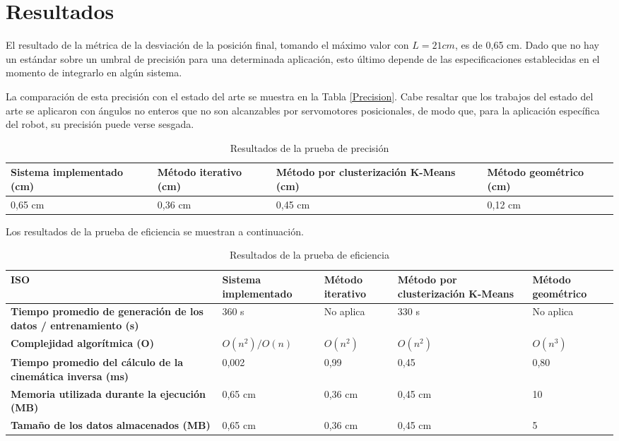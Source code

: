 \section{Resultados}

El resultado de la métrica de la desviación de la posición final, tomando el máximo valor con $L = 21 cm$, es de 0,65 cm. Dado que no hay un estándar sobre un umbral de precisión para una determinada aplicación, esto último depende de las especificaciones establecidas en el momento de integrarlo en algún sistema.

La comparación de esta precisión con el estado del arte se muestra en la Tabla \ref{Precision}. Cabe resaltar que los trabajos del estado del arte se aplicaron con ángulos no enteros que no son alcanzables por servomotores posicionales, de modo que, para la aplicación específica del robot, su precisión puede verse sesgada.

\begin{table}[ht]
	\centering
	\begin{tabular}{p{5cm}p{4cm}p{3.6cm}p{4cm}}
		\hline
		\textbf{Sistema implementado (cm)} & \textbf{Método iterativo (cm)} & \textbf{Método por clusterización K-Means (cm)} & \textbf{Método geométrico (cm)} \\
		\hline
		0,65 cm & 0,36 cm & 0,45 cm & 0,12 cm \\
		\hline
	\end{tabular}
	\caption{Resultados de la prueba de precisión}
	\label{tab:Precision}
\end{table}

Los resultados de la prueba de eficiencia se muestran a continuación.

\begin{table}[ht]
	\centering
	\begin{tabular}{p{3.2cm}p{3.2cm}p{3.2cm}p{3.2cm}p{3.2cm}}
		\hline
	    \textbf{ISO} & \textbf{Sistema implementado} & \textbf{Método iterativo} & \textbf{Método por clusterización K-Means} & \textbf{Método geométrico} \\
		\hline
		\textbf{Tiempo promedio de generación de los datos / entrenamiento (s)} & 360 s & No aplica & 330 s & No aplica \\
		\textbf{Complejidad algorítmica (O)} & $O(n^2)/O(n)$ & $O(n^2)$ & $O(n^2)$ & $O(n^3)$ \\
		\textbf{Tiempo promedio del cálculo de la cinemática inversa (ms)} & 0,002 & 0,99 & 0,45 & 0,80 \\
		\textbf{Memoria utilizada durante la ejecución (MB)} & 0,65 cm & 0,36 cm & 0,45 cm & 10 \\
		\textbf{Tamaño de los datos almacenados (MB)} & 0,65 cm & 0,36 cm & 0,45 cm & 5 \\
		\hline
	\end{tabular}
	\caption{Resultados de la prueba de eficiencia}
	\label{tab:Precision}
\end{table}
